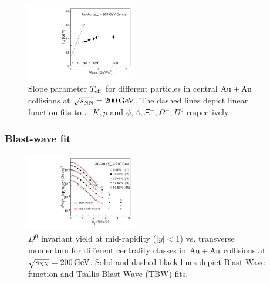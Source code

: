 \documentclass[%
 reprint,	
 amsmath,amssymb,
 aps,
 prc,
]{revtex4-1}
\begin{document}

\begin{figure}
\centering
\includegraphics[width=0.43\textwidth]{fig/Teff_ALL.pdf}
\caption{Slope parameter $T_{\rm eff}$ for different particles in central ${\rm{Au + Au}}$ collisions at ${\sqrt{s_{\rm NN}} = \rm{200\,GeV}}$. The dashed lines depict linear function fits to $\pi,K,p$ and $\phi,\Lambda,\Xi^{-},\Omega^{-},D^0$ respectively.}
\label{fig:Teff_ALL} 
\end{figure}


\subsubsection{\label{result:collectivity:BW}Blast-wave fit}

\begin{figure}
\centering
\includegraphics[width=0.43\textwidth]{fig/BWFit.pdf}
\caption{$D^{0}$ invariant yield at mid-rapidity ($|y|<1$) vs. transverse momentum for different centrality classes in ${\rm{Au + Au}}$ collisions at ${\sqrt{s_{\rm NN}} = \rm{200\,GeV}}$. Solid and dashed black lines depict Blast-Wave function and Tsallis Blast-Wave (TBW) fits.}
\label{fig:BWFit} 
\end{figure}
\end{document}
